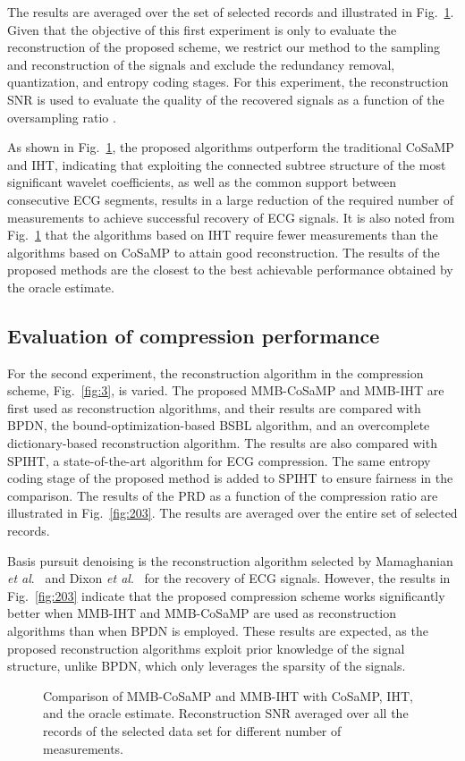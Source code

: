 \documentclass[journal]{IEEEtran}
\begin{document}
The results are averaged over the set of selected records and illustrated in Fig.~\ref{fig:202}. Given that the objective of this first experiment is only to evaluate the reconstruction of the proposed scheme, we restrict our method to the sampling and reconstruction of the signals and exclude the redundancy removal, quantization, and entropy coding stages. For this experiment, the reconstruction SNR is used to evaluate the quality of the recovered signals as a function of the oversampling ratio .

As shown in Fig.~\ref{fig:202}, the proposed algorithms outperform the traditional CoSaMP and IHT, indicating that exploiting the connected subtree structure of the most significant wavelet coefficients, as well as the common support between consecutive ECG segments, results in a large reduction of the required number of measurements to achieve successful recovery of ECG signals. It is also noted from Fig.~\ref{fig:202} that the algorithms based on IHT require fewer measurements than the algorithms based on CoSaMP to attain good reconstruction. The results of the proposed methods are the closest to the best achievable performance obtained by the oracle estimate.

\subsection{Evaluation of compression performance}
For the second experiment, the reconstruction algorithm in the compression scheme, Fig.~\ref{fig:3}, is varied. The proposed MMB-CoSaMP and  MMB-IHT are first used as reconstruction algorithms, and their results are compared with BPDN, the bound-optimization-based BSBL algorithm, and an overcomplete dictionary-based reconstruction algorithm. The results are also compared with SPIHT, a state-of-the-art algorithm for ECG compression. The same entropy coding stage of the proposed method is added to SPIHT to ensure fairness in the comparison. The results of the PRD as a function of the compression ratio are illustrated in Fig.~\ref{fig:203}. The results are averaged over the entire set of selected records.

Basis pursuit denoising is the reconstruction algorithm selected by Mamaghanian \textit{et al}.~\cite{Mama11} and Dixon \textit{et al}.~\cite{Dixo12} for the recovery of ECG signals. However, the results in Fig.~\ref{fig:203} indicate that the proposed compression scheme works significantly better when MMB-IHT and MMB-CoSaMP are used as reconstruction algorithms than when BPDN is employed. These results are expected, as the proposed reconstruction algorithms exploit prior knowledge of the signal structure, unlike BPDN, which only leverages the sparsity of the signals.
\begin{figure}[t]
\caption{Comparison of MMB-CoSaMP and MMB-IHT with CoSaMP, IHT, and the oracle estimate. Reconstruction SNR averaged over all the records of the selected data set for different number of measurements.} \label{fig:202}
\end{figure}
\end{document}
